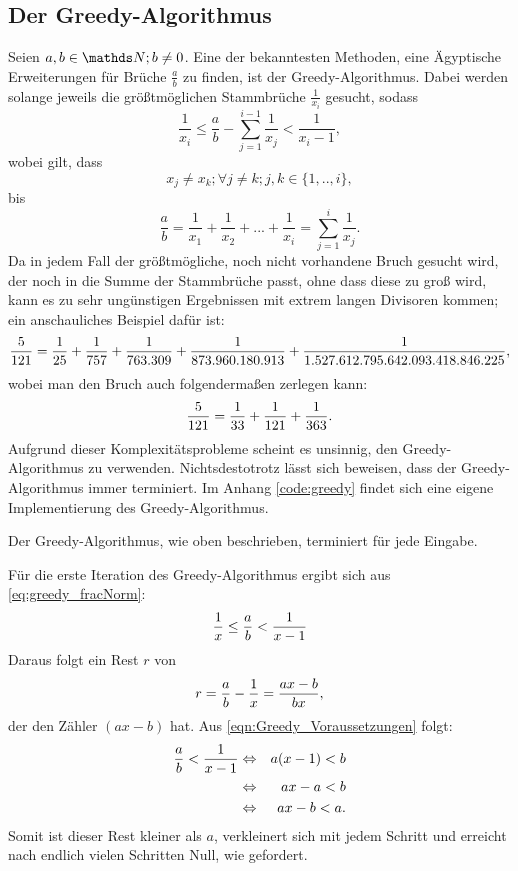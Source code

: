 \subsection{Der Greedy-Algorithmus}
Seien $a, b \in \N; b \neq 0$. Eine der bekanntesten Methoden, eine Ägyptische Erweiterungen für Brüche $\frac{a}{b}$ zu finden, ist der Greedy-Algorithmus. Dabei werden solange jeweils die größtmöglichen Stammbrüche $\frac{1}{x_i}$ gesucht, sodass
\begin{equation}\label{eq:greedy_fracNorm}
\frac{1}{x_i} \leq \frac{a}{b} - \sum_{j=1}^{i-1} \frac{1}{x_j} < \frac{1}{x_{i}-1},
\end{equation}
wobei gilt, dass
$$x_j \neq x_k; \forall j \neq k; j,k \in \{1,..,i\},$$ 
bis
$$\frac{a}{b} = \frac{1}{x_1} + \frac{1}{x_2} + ... + \frac{1}{x_i} = \sum_{j=1}^{i} \frac{1}{x_j}.$$
Da in jedem Fall der größtmögliche, noch nicht vorhandene Bruch gesucht wird, der noch in die Summe der Stammbrüche passt, ohne dass diese zu groß wird, kann es zu sehr ungünstigen Ergebnissen mit extrem langen Divisoren kommen; ein anschauliches Beispiel dafür ist:
$$\frac{5}{121} = \frac{1}{25} + \frac{1}{757} + \frac{1}{763.309} + \frac{1}{873.960.180.913} + \frac{1}{1.527.612.795.642.093.418.846.225},$$
wobei man den Bruch auch folgendermaßen zerlegen kann:
$$\frac{5}{121} = \frac{1}{33} + \frac{1}{121} + \frac{1}{363}.$$
Aufgrund dieser Komplexitätsprobleme scheint es unsinnig, den Greedy-Algorithmus zu verwenden. Nichtsdestotrotz lässt sich beweisen, dass der Greedy-Algorithmus immer terminiert.
Im Anhang \ref{code:greedy} findet sich eine eigene Implementierung des Greedy-Algorithmus.

\begin{satz}
	Der Greedy-Algorithmus, wie oben beschrieben, terminiert für jede Eingabe.
\end{satz}
\begin{bew}
	Für die erste Iteration des Greedy-Algorithmus ergibt sich aus \ref{eq:greedy_fracNorm}:
	\begin{equation}\label{eqn:Greedy_Voraussetzungen}
		\frac{1}{x} \leq \frac{a}{b} < \frac{1}{x-1}
	\end{equation}
	Daraus folgt ein Rest $r$ von
	$$ r = \frac{a}{b}-\frac{1}{x} = \frac{ax-b}{bx},$$
	der den Zähler $(ax-b)$ hat. Aus \ref{eqn:Greedy_Voraussetzungen} folgt:
	\begin{eqnarray*}
		\frac{a}{b} < \frac{1}{x-1}& \Leftrightarrow & a(x-1)<b\\
		& \Leftrightarrow & ax-a < b\\
		& \Leftrightarrow & ax-b < a.\\
	\end{eqnarray*}
	Somit ist dieser Rest kleiner als $a$, verkleinert sich mit jedem Schritt und erreicht nach endlich vielen Schritten Null, wie gefordert.
\end{bew}